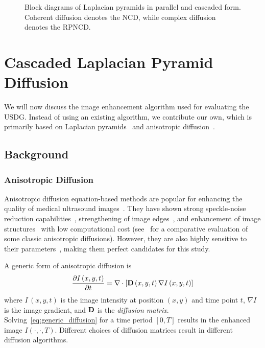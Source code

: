 \begin{figure}
\begin{minipage}[c]{0.53\textwidth}
    \label{fig:clpd}
  \end{minipage}
  \caption{Block diagrams of Laplacian pyramids in parallel and cascaded form.
    Coherent diffusion denotes the NCD, while complex diffusion denotes the RPNCD.
  }\label{fig:filters}
  \vspace{-0.15in}
\end{figure}
%
\section{Cascaded Laplacian Pyramid Diffusion}\label{section:filter}
%
We will now discuss the image enhancement algorithm used for evaluating the USDG.
Instead of using an existing algorithm, we contribute our own, which is primarily based on Laplacian pyramids~\cite{zhang_multiscale_2006, zhang_nonlinear_2007, kang_new_2016} and anisotropic diffusion~\cite{perona_scalespace_1990, weickert_anisotropic_1998}.

\subsection{Background}
\subsubsection{Anisotropic Diffusion}\label{section:diffusion}
%
Anisotropic diffusion equation-based methods are popular for enhancing the quality of medical ultrasound images~\cite{perona_scalespace_1990, weickert_anisotropic_1998, yongjianyu_speckle_2002, contrerasortiz_ultrasound_2012}.
They have shown strong speckle-noise reduction capabilities~\cite{duarte-salazar_speckle_2020}, strengthening of image edges~\cite{zhang_multiscale_2006}, and enhancement of image structures~\cite{abd-elmoniem_realtime_2002, kang_new_2016} with low computational cost (see~\cite{finn_echocardiographic_2011} for a comparative evaluation of some classic anisotropic diffusions).
However, they are also highly sensitive to their parameters~\cite{duarte-salazar_speckle_2020}, making them perfect candidates for this study.

A generic form of anisotropic diffusion is
\begin{align}
  \frac{\partial I\,(x, y, t)}{\partial t} = \nabla \cdot [ \mathbf{D}\,(x, y, t) \, \nabla I\,(x, y, t) ] \label{eq:generic_diffusion}
\end{align}
where \(I\,(x, y, t)\) is the image intensity at position \((x, y)\) and time point \(t\), \(\nabla I\) is the image gradient, and \(\mathbf{D}\) is the \textit{diffusion matrix}.
Solving~\cref{eq:generic_diffusion} for a time period \([0, T]\) results in the enhanced image \(I\left(\cdot, \cdot, T\right)\).
Different choices of diffusion matrices result in different diffusion algorithms.

